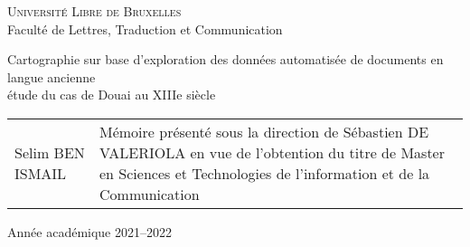 
\begin{titlepage} %
\begin{center} 
\huge{\textsc{Université Libre de Bruxelles}}\\
\vspace{.5cm}
\LARGE{Faculté de Lettres, Traduction et Communication}
\end{center}

\vfill %

\begin{center}
\Huge{Cartographie sur base d’exploration des données automatisée de documents en langue ancienne}\\ %
\vspace{.5cm}
\LARGE{étude du cas de Douai au XIIIe siècle} %
\end{center}

\vfill

\begin{tabular}{b{5.5cm}b{7.5cm}} %
Selim \textsc{BEN ISMAIL} & Mémoire présenté sous la direction de Sébastien \textsc{DE VALERIOLA} en vue de l'obtention du titre de Master en Sciences et Technologies de l'information et de la Communication\\ %
\end{tabular}
\vfill
\begin{center}
Année académique 2021--2022 %
\end{center}
\end{titlepage}
